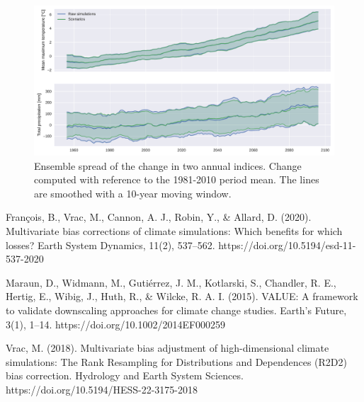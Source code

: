 \documentclass[letterpaper,10pt]{article}
\begin{document}
\begin{figure}
\centering
\includegraphics[width=\textwidth]{../images/ensemble_variability.pdf}
\caption{Ensemble spread of the change in two annual indices. Change computed with reference to the 1981-2010 period mean. The lines are smoothed with a 10-year moving window.}\label{fig:ensvar}
\end{figure}

\begin{thebibliography}{6}
 François, B., Vrac, M., Cannon, A. J., Robin, Y., \& Allard, D. (2020). Multivariate bias corrections of climate simulations: Which benefits for which losses? Earth System Dynamics, 11(2), 537–562. https://doi.org/10.5194/esd-11-537-2020

 Maraun, D., Widmann, M., Gutiérrez, J. M., Kotlarski, S., Chandler, R. E., Hertig, E., Wibig, J., Huth, R., \& Wilcke, R. A. I. (2015). VALUE: A framework to validate downscaling approaches for climate change studies. Earth’s Future, 3(1), 1–14. https://doi.org/10.1002/2014EF000259

 Vrac, M. (2018). Multivariate bias adjustment of high-dimensional climate simulations: The Rank Resampling for Distributions and Dependences (R2D2) bias correction. Hydrology and Earth System Sciences. https://doi.org/10.5194/HESS-22-3175-2018
\end{thebibliography}
\end{document}
